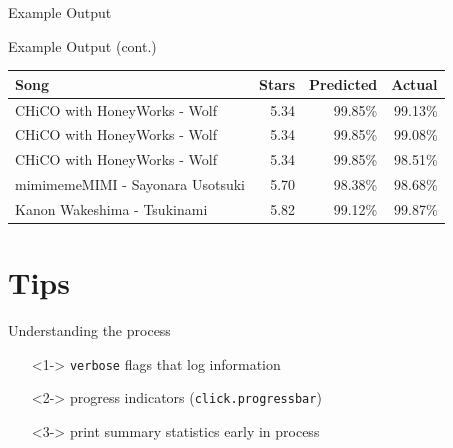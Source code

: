 \documentclass[table]{beamer}
\begin{document}
\begin{frame}{Example Output}
\end{frame}

\begin{frame}{Example Output (cont.)}
  \begin{center}
    \begin{tabular}{l | r | r | r}
      Song & Stars & Predicted & Actual \\
      \hline
      CHiCO with HoneyWorks - Wolf & 5.34 & 99.85\% & 99.13\% \\
      CHiCO with HoneyWorks - Wolf & 5.34 & 99.85\% & 99.08\% \\
      CHiCO with HoneyWorks - Wolf & 5.34 & 99.85\% & 98.51\% \\
      \hline
      mimimemeMIMI - Sayonara Usotsuki & 5.70 & 98.38\% & 98.68\% \\
      Kanon Wakeshima - Tsukinami & 5.82 & 99.12\% & 99.87\% \\
    \end{tabular}
  \end{center}
\end{frame}

\section{Tips}

\begin{frame}{Understanding the process}
  \begin{itemize}
  \item[]<1-> \texttt{verbose} flags that log information
  \item[]<2-> progress indicators (\texttt{click.progressbar})
  \item[]<3-> print summary statistics early in process
  \end{itemize}
\end{frame}
\end{document}

